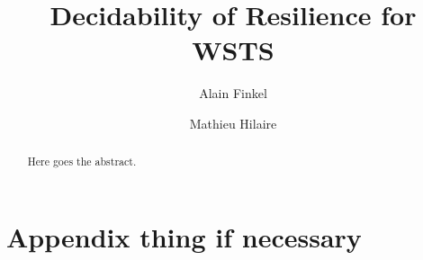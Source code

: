 \documentclass[a4paper,UKenglish,cleveref, autoref, thm-restate]{lipics-v2021}
\title{Decidability of Resilience for WSTS}
\author{Alain Finkel}{}{}{}{}
\author{Mathieu Hilaire}
{Université Paris-Saclay\and CNRS\and ENS Paris-Saclay\and Laboratoire Méthodes Formelles (LMF)\and Gif-sur-Yvette, France}{hilaire@lsv.fr}{}{This work was partly done while the author was supported by the Agence Nationale de la Recherche grant no. (numero de la grant BraVASS).}
\begin{document}
\maketitle


\begin{abstract}
	Here goes the abstract.
\end{abstract}


\newcommand{\LCM}{\mathsf{LCM}}
\newcommand{\LOGSPACE}{\mathsf{LOGSPACE}}
\newcommand{\MSO}{\mathsf{MSO}}
\newcommand{\SO}{\mathsf{SO}}

 \newcommand{\N}{\mathds{N}}



%	









% 	






\appendix


\section{Appendix thing if necessary}\label{appendix}
\end{document}
